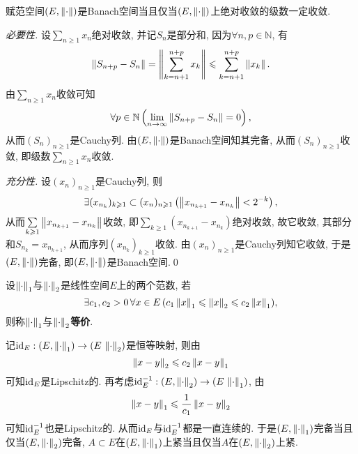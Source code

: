 	\begin{Theorem}
	赋范空间$ (E,\left\| \cdot \right\|) $是Banach空间当且仅当$ (E,\left\| \cdot \right\|) $上绝对收敛的级数一定收敛.
	\end{Theorem}
	\begin{Proof}
	\textsl{必要性.} 设$ \sum\limits_{n\geqslant 1}x_n $绝对收敛, 并记$ S_n $是部分和, 因为$ \forall n,p\in\mathbb{N} $, 有
	\[
	\left\| S_{n+p}-S_n \right\|=\left\| \sum_{k=n+1}^{n+p}x_k \right\|\leqslant\sum_{k=n+1}^{n+p}\left\| x_k \right\|.
	\]
	由$ \sum\limits_{n\geqslant 1}x_n $收敛可知
	\[
	\forall p\in\mathbb{N}\left(\lim_{n\to\infty}\left\| S_{n+p}-S_n \right\|=0\right),
	\]
	从而$ (S_n)_{n\geqslant 1} $是Cauchy列. 由$ (E,\left\| \cdot \right\|) $是Banach空间知其完备, 从而$ (S_n)_{n\geqslant 1} $收敛, 即级数$ \sum\limits_{n\geqslant 1}x_n $收敛.
	
	\textsl{充分性.} 设$ (x_n)_{n\geqslant 1} $是Cauchy列, 则
	\[
	\exists(x_{n_k})_{k\geqslant 1}\subset(x_n)_{n\geqslant 1}\left(\left\| x_{n_{k+1}}-x_{n_k} \right\|<2^{-k}\right),
	\]
	从而$ \sum\limits_{k\geqslant 1}\left\| x_{n_{k+1}}-x_{n_k} \right\| $收敛, 即$ \sum\limits_{k\geqslant 1}(x_{n_{k+1}}-x_{n_k}) $绝对收敛, 故它收敛, 其部分和$ S_{n_k}=x_{n_{k+1}} $, 从而序列$ (x_{n_k})_{k\geqslant 1} $收敛. 由$ (x_n)_{n\geqslant 1} $是Cauchy列知它收敛, 于是$ (E,\left\| \cdot \right\|) $完备, 即$ (E,\left\| \cdot \right\|) $是Banach空间.\qed
	\end{Proof}
	
	\begin{Definition}[范数等价]
		设$ \left\| \cdot \right\|_1 $与$ \left\| \cdot \right\|_2 $是线性空间$ E $上的两个范数, 若
		\[
		\exists c_1,c_2>0\,\forall x\in E\,(c_1\left\| x \right\|_1\leqslant\left\| x \right\|_2\leqslant c_2\left\| x \right\|_1),
		\]
		则称$ \left\| \cdot \right\|_1 $与$ \left\| \cdot \right\|_2 $\textbf{等价}.
	\end{Definition}
	
	\begin{Remark}
	记$ \mathrm{id}_E : (E,\left\| \cdot \right\|_1)\to(E\,\left\| \cdot \right\|_2) $是恒等映射, 则由
	\[
	\left\| x-y \right\|_2\leqslant c_2\left\| x-y \right\|_1
	\]
	可知$ \mathrm{id}_E $是Lipschitz的. 再考虑$ \mathrm{id}_E^{-1} : (E,\left\| \cdot \right\|_2)\to(E\,\left\| \cdot \right\|_1) $, 由
	\[
	\left\| x-y \right\|_1\leqslant\frac{1}{c_1}\left\| x-y \right\|_2
	\]
	可知$ \mathrm{id}_E^{-1} $也是Lipschitz的. 从而$ \mathrm{id}_E $与$ \mathrm{id}_E^{-1} $都是一直连续的. 于是$ (E,\left\| \cdot \right\|_1) $完备当且仅当$ (E,\left\| \cdot \right\|_2) $完备, $ A\subset E $在$ (E,\left\| \cdot \right\|_1) $上紧当且仅当$ A $在$ (E,\left\| \cdot \right\|_2) $上紧.
	\end{Remark}
	
